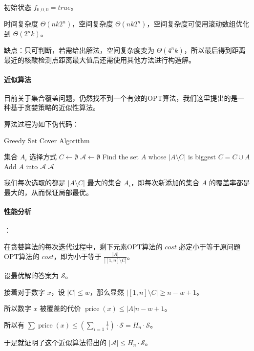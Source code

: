 \documentclass{cumcmthesis}
\begin{document}
初始状态 $f_{0,0,0} = true$。

时间复杂度 $\Theta(nk2^n)$，空间复杂度 $\Theta(nk2^n)$，空间复杂度可使用滚动数组优化到 $\Theta(2^nk)$。

缺点：只可判断，若需给出解法，空间复杂度变为 $\Theta(4^nk)$，所以最后得到距离最近的核酸检测点距离最大值后还需使用其他方法进行构造解。

\paragraph{近似算法}

目前关于集合覆盖问题，仍然找不到一个有效的OPT算法，我们这里提出的是一种基于贪婪策略的近似性算法。

算法过程为如下伪代码：

\begin{algorithm}
    \caption{Greedy Set Cover Algorithm}
    \begin{algorithmic}[1]
        \Require 集合 $A_i$
        \Ensure 选择方式
        \State $C \gets \emptyset$
        \State $\mathscr{A} \gets \emptyset$
            \State Find the set $A$ whose $|A\setminus C|$ is biggest
            \State $C = C \cup A$
            \State Add $A$ into $\mathscr{A}$
        \EndWhile
        \State \Return $\mathscr{A}$
    \end{algorithmic}
\end{algorithm}

我们每次选取的都是 $|A\setminus C|$ 最大的集合 $A_i$，即每次新添加的集合 $A$ 的覆盖率都是最大的，从而保证局部最优。

\paragraph{性能分析}：

在贪婪算法的每次迭代过程中，剩下元素OPT算法的 $cost$ 必定小于等于原问题OPT算法的 $cost$，即为小于等于 $\frac{|A|}{|[1,n]\setminus C|}$。

设最优解的答案为 $\mathscr{S}$。

接着对于数字 $x$，设 $|C| \le w$，那么显然 $|[1,n]\setminus C| \ge n - w + 1$。

所以数字 $x$ 被覆盖的代价 $\operatorname{price}(x) \le {|A|}{n-w+1}$。

所以有 $\sum \operatorname{price}(x) \le (\sum_{i=1}\frac{1}{i}) \cdot \mathscr{S} = H_n \cdot \mathscr{S}$。

于是就证明了这个近似算法得出的 $|\mathscr{A}| \le H_n \cdot \mathscr{S}$。
\end{document}
